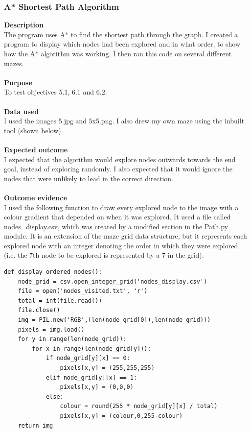 \documentclass[titlepage]{article}
\begin{document}
\subsubsection{A* Shortest Path Algorithm}
\textbf{Description}\\
The program uses A* to find the shortest path through the graph. I created a program to display which nodes had been explored and in what order, to show how the A* algorithm was working. I then ran this code on several different mazes.\\\\
\textbf{Purpose}\\
To test objectives 5.1, 6.1 and 6.2.\\\\
\textbf{Data used} \\
I used the images 5.jpg and 5x5.png. I also drew my own maze using the inbuilt tool (shown below).\\\\
\textbf{Expected outcome}\\
I expected that the algorithm would explore nodes outwards towards the end goal, instead of exploring randomly. I also expected that it would ignore the nodes that were unlikely to lead in the correct direction.\\\\
\textbf{Outcome evidence}\\
I used the following function to draw every explored node to the image with a colour gradient that depended on when it was explored. It used a file called nodes\_display.csv, which was created by a modified section in the Path.py module. It is an extension of the maze grid data structure, but it represents each explored node with an integer denoting the order in which they were explored (i.e. the 7th node to be explored is represented by a 7 in the grid). 

\begin{changemargin}{-1in}{-1in} 
\begin{verbatim}
def display_ordered_nodes():
    node_grid = csv.open_integer_grid('nodes_display.csv')
    file = open('nodes_visited.txt', 'r')
    total = int(file.read())
    file.close()
    img = PIL.new('RGB',(len(node_grid[0]),len(node_grid)))
    pixels = img.load()
    for y in range(len(node_grid)):
        for x in range(len(node_grid[y])):
            if node_grid[y][x] == 0:
                pixels[x,y] = (255,255,255)
            elif node_grid[y][x] == 1:
                pixels[x,y] = (0,0,0)
            else:
                colour = round(255 * node_grid[y][x] / total)
                pixels[x,y] = (colour,0,255-colour)
    return img
\end{verbatim}
\end{changemargin} 
\end{document}
